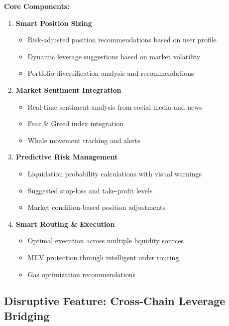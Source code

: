 \documentclass{article}
\begin{document}
\textbf{Core Components:}
\begin{enumerate}[leftmargin=*]
    \item \textbf{Smart Position Sizing}
    \begin{itemize}
        \item Risk-adjusted position recommendations based on user profile
        \item Dynamic leverage suggestions based on market volatility
        \item Portfolio diversification analysis and recommendations
    \end{itemize}
    
    \item \textbf{Market Sentiment Integration}
    \begin{itemize}
        \item Real-time sentiment analysis from social media and news
        \item Fear \& Greed index integration
        \item Whale movement tracking and alerts
    \end{itemize}
    
    \item \textbf{Predictive Risk Management}
    \begin{itemize}
        \item Liquidation probability calculations with visual warnings
        \item Suggested stop-loss and take-profit levels
        \item Market condition-based position adjustments
    \end{itemize}
    
    \item \textbf{Smart Routing \& Execution}
    \begin{itemize}
        \item Optimal execution across multiple liquidity sources
        \item MEV protection through intelligent order routing
        \item Gas optimization recommendations
    \end{itemize}
\end{enumerate}

\subsection{Disruptive Feature: Cross-Chain Leverage Bridging}
\end{document}
